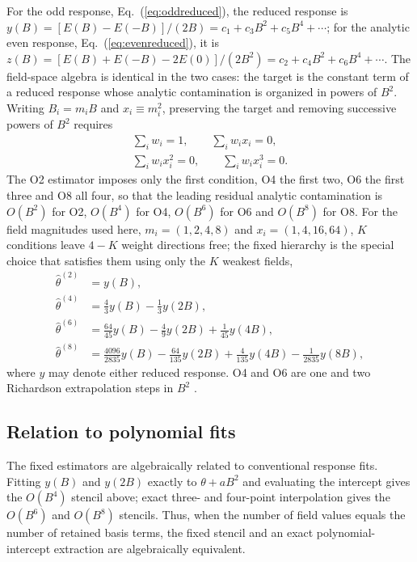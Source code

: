 \documentclass[aps,prd,reprint,twocolumn,superscriptaddress,nofootinbib,longbibliography]{revtex4-2}
\begin{document}
For the odd response, Eq.~(\ref{eq:oddreduced}), the reduced response is $y(B)=[E(B)-E(-B)]/(2B)=c_1+c_3B^2+c_5B^4+\cdots$; for the analytic even response, Eq.~(\ref{eq:evenreduced}), it is $z(B)=[E(B)+E(-B)-2E(0)]/(2B^2)=c_2+c_4B^2+c_6B^4+\cdots$. The field-space algebra is identical in the two cases: the target is the constant term of a reduced response whose analytic contamination is organized in powers of $B^2$. Writing $B_i=m_iB$ and $x_i\equiv m_i^2$, preserving the target and removing successive powers of $B^2$ requires
\begin{equation}
\begin{gathered}
\sum_i w_i = 1,\qquad
\sum_i w_i x_i = 0,\\
\sum_i w_i x_i^2 = 0,\qquad
\sum_i w_i x_i^3 = 0.
\end{gathered}
\label{eq:sum_constraint}
\end{equation}
The O2 estimator imposes only the first condition, O4 the first two, O6 the first three and O8 all four, so that the leading residual analytic contamination is $O(B^2)$ for O2, $O(B^4)$ for O4, $O(B^6)$ for O6 and $O(B^8)$ for O8. For the field magnitudes used here, $m_i=(1,2,4,8)$ and $x_i=(1,4,16,64)$, $K$ conditions leave $4-K$ weight directions free; the fixed hierarchy is the special choice that satisfies them using only the $K$ weakest fields,
\begin{align}
\widehat\theta^{(2)} &= y(B),\nonumber\\
\widehat\theta^{(4)} &= \tfrac43y(B)-\tfrac13y(2B),\nonumber\\
\widehat\theta^{(6)} &= \tfrac{64}{45}y(B)-\tfrac49y(2B)+\tfrac1{45}y(4B),\nonumber\\
\widehat\theta^{(8)} &= \tfrac{4096}{2835}y(B)-\tfrac{64}{135}y(2B)+\tfrac4{135}y(4B)-\tfrac1{2835}y(8B),
\label{eq:fixedhierarchy}
\end{align}
where $y$ may denote either reduced response. O4 and O6 are one and two Richardson extrapolation steps in $B^2$ \cite{Richardson1927}.

\subsection{Relation to polynomial fits}

The fixed estimators are algebraically related to conventional response fits. Fitting $y(B)$ and $y(2B)$ exactly to $\theta+aB^2$ and evaluating the intercept gives the $O(B^4)$ stencil above; exact three- and four-point interpolation gives the $O(B^6)$ and $O(B^8)$ stencils. Thus, when the number of field values equals the number of retained basis terms, the fixed stencil and an exact polynomial-intercept extraction are algebraically equivalent.
\end{document}
